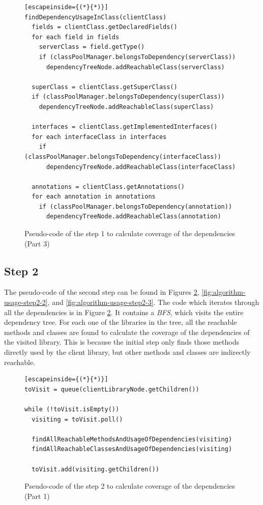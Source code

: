 \begin{figure}[ht!]
\begin{lstlisting}[escapeinside={(*}{*)}]
findDependencyUsageInClass(clientClass)
  fields = clientClass.getDeclaredFields()
  for each field in fields
    serverClass = field.getType()
    if (classPoolManager.belongsToDependency(serverClass))
      dependencyTreeNode.addReachableClass(serverClass)

  superClass = clientClass.getSuperClass()
  if (classPoolManager.belongsToDependency(superClass))
    dependencyTreeNode.addReachableClass(superClass)

  interfaces = clientClass.getImplementedInterfaces()
  for each interfaceClass in interfaces
    if (classPoolManager.belongsToDependency(interfaceClass))
      dependencyTreeNode.addReachableClass(interfaceClass)

  annotations = clientClass.getAnnotations()
  for each annotation in annotations
    if (classPoolManager.belongsToDependency(annotation))
      dependencyTreeNode.addReachableClass(annotation)
\end{lstlisting}
\caption{Pseudo-code of the step 1 to calculate coverage of the dependencies (Part 3)}
\label{fig:algorithm-usage-step1-3}
\end{figure}

\subsection{Step 2}
The pseudo-code of the second step can be found in Figures \ref{fig:algorithm-usage-step2-1}, \ref{fig:algorithm-usage-step2-2}, and \ref{fig:algorithm-usage-step2-3}. The code which iterates through all the dependencies is in Figure \ref{fig:algorithm-usage-step2-1}. It contains a \textit{BFS}, which visits the entire dependency tree. For each one of the libraries in the tree, all the reachable methods and classes are found to calculate the coverage of the dependencies of the visited library. This is because the initial step only finds those methods directly used by the client library, but other methods and classes are indirectly reachable.

\begin{figure}[ht!]
\begin{lstlisting}[escapeinside={(*}{*)}]
toVisit = queue(clientLibraryNode.getChildren())

while (!toVisit.isEmpty())
  visiting = toVisit.poll()

  findAllReachableMethodsAndUsageOfDependencies(visiting)
  findAllReachableClassesAndUsageOfDependencies(visiting)

  toVisit.add(visiting.getChildren())
\end{lstlisting}
\caption{Pseudo-code of the step 2 to calculate coverage of the dependencies (Part 1)}
\label{fig:algorithm-usage-step2-1}
\end{figure}

